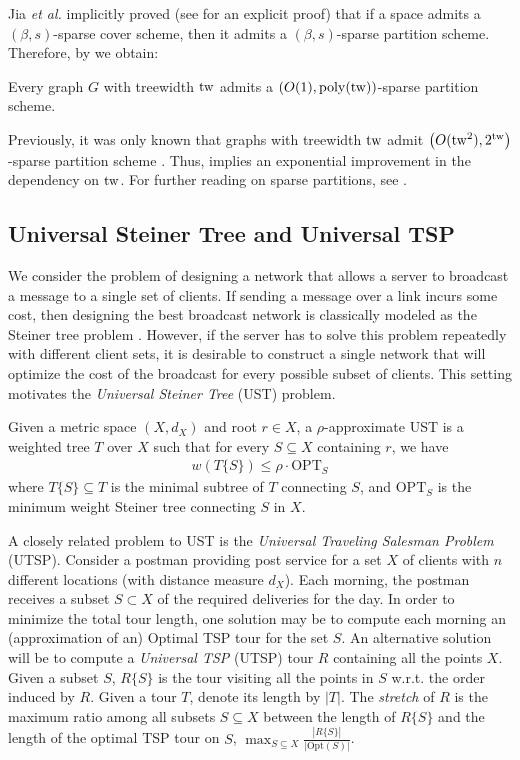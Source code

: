 \documentclass{theoretics}
\newcommand{\tw}{{\rm tw}}
\newcommand{\poly}{\mathrm{poly}}
\newcommand{\etal}{{\em et al. \xspace}}
\newcommand{\UST}{\textsf{UST}\xspace}
\newcommand{\OPT}{\text{OPT}}
\newcommand{\UTSP}{\textsf{UTSP}\xspace}
\newcommand{\TSP}{\textsf{TSP}\xspace}
\begin{document}
Jia \etal \cite{JLNRS05} implicitly proved (see \cite{Fil20} for an explicit proof) that if a space admits a $(\beta,s)$-sparse cover scheme, then it admits a $(\beta,s)$-sparse partition scheme. Therefore, by  we obtain:

\begin{corollary}\label{cor:sparsePartition}
	Every graph $G$ with treewidth $\tw$ admits a $\left(O(1),\poly(\tw)\right)$-sparse partition scheme. 
\end{corollary}

Previously, it was only known that graphs with treewidth $\tw$ admit  $\left(O(\tw^2),2^{\tw}\right)$-sparse partition scheme \cite{FT03,Fil20}.  Thus,  implies an exponential improvement in the dependency on $\tw$.  For further reading on sparse partitions, see \cite{JLNRS05,BDRRS12,Fil20,CJFKVY23,Filtser24}.

\subsection{Universal Steiner Tree and Universal TSP}

We consider the problem of designing a network that allows a server to broadcast a message to a single set of clients. If sending a message over a link incurs some cost, then designing the best broadcast network is classically modeled as the Steiner tree problem \cite{HR92}. However, if the server has to solve this problem repeatedly with different client sets, it is desirable to construct a single network that will optimize the cost of the broadcast for every possible subset of clients. This setting motivates the \emph{Universal Steiner Tree} (\UST) problem.

Given a metric space $(X,d_X)$ and root  $r \in X$, a $\rho$-approximate \UST is a weighted tree $T$ over $X$ such that for every $S \subseteq X$ containing $r$, we have
\begin{align*}
	w(T\{S\}) \leq \rho \cdot \OPT_S
\end{align*}
where $T\{S\} \subseteq T$ is the minimal subtree of $T$ connecting $S$, and $\OPT_S$ is the minimum weight Steiner tree connecting $S$ in $X$.




A closely related problem to \UST is the \emph{Universal Traveling Salesman Problem} (\UTSP).
Consider a postman providing post service for a set $X$ of clients with $n$ different locations (with distance measure $d_X$). Each morning, the postman receives a subset $S\subset X$ of the required deliveries for the day. In order to minimize the total tour length, one solution may be to compute each morning an (approximation of an) Optimal \TSP tour for the set $S$. An alternative solution will be to compute a \emph{Universal \TSP} (\UTSP) tour $R$ containing all the points $X$. Given a subset $S$, $R\{S\}$ is the tour visiting all the points in $S$ w.r.t. the order induced by $R$.
Given a tour $T$, denote its length by $|T|$. The \emph{stretch} of $R$ is the maximum ratio among all subsets $S\subseteq X$ between the length of $R\{S\}$ and the length of the optimal \TSP tour on $S$, $\max_{S\subseteq X}\frac{|R\{S\}|}{|\mbox{Opt}(S)|}$.
\end{document}
